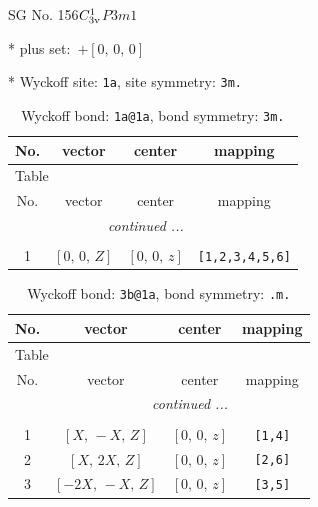 \documentclass[fleqn,8pt]{jsarticle}
\begin{document}
\setcounter{MaxMatrixCols}{32}

\renewcommand{\tablename}{Table~}
\renewcommand{\figurename}{Figure~}
\begin{center}
\LARGE
SG No. 156\quad$C_{\rm 3v}^{1}$\quad$P3m1$\quad[ trigonal ]
\end{center}

* plus set:\,\,\,$+\left[ 0,\, 0,\, 0 \right]$


* Wyckoff site: {\tt 1a}, site symmetry: {\tt 3m.}
\renewcommand{\arraystretch}{1.2}
\begin{longtable}{cccc}
\caption{Wyckoff bond: {\tt 1a@1a}, bond symmetry: {\tt 3m.}}
 \\
 \hline \hline
No. & vector & center & mapping \\ \hline \endfirsthead

\multicolumn{3}{l}{\tablename\ \thetable{}} \\
 \hline \hline
No. & vector & center & mapping \\ \hline \endhead

 \hline \hline
\multicolumn{3}{r}{\footnotesize\it continued ...} \\ \endfoot

 \hline \hline
\multicolumn{3}{r}{} \\ \endlastfoot

1 & $\left[ 0,\, 0,\, Z \right]$ & $\left[ 0,\, 0,\, z \right]$ & {\tt [1,2,3,4,5,6]} \\
\end{longtable}
\renewcommand{\arraystretch}{1.2}
\begin{longtable}{cccc}
\caption{Wyckoff bond: {\tt 3b@1a}, bond symmetry: {\tt .m.}}
 \\
 \hline \hline
No. & vector & center & mapping \\ \hline \endfirsthead

\multicolumn{3}{l}{\tablename\ \thetable{}} \\
 \hline \hline
No. & vector & center & mapping \\ \hline \endhead

 \hline \hline
\multicolumn{3}{r}{\footnotesize\it continued ...} \\ \endfoot

 \hline \hline
\multicolumn{3}{r}{} \\ \endlastfoot

1 & $\left[ X,\, - X,\, Z \right]$ & $\left[ 0,\, 0,\, z \right]$ & {\tt [1,4]} \\ \hline
2 & $\left[ X,\, 2 X,\, Z \right]$ & $\left[ 0,\, 0,\, z \right]$ & {\tt [2,6]} \\ \hline
3 & $\left[ - 2 X,\, - X,\, Z \right]$ & $\left[ 0,\, 0,\, z \right]$ & {\tt [3,5]} \\
\end{longtable}
\end{document}

